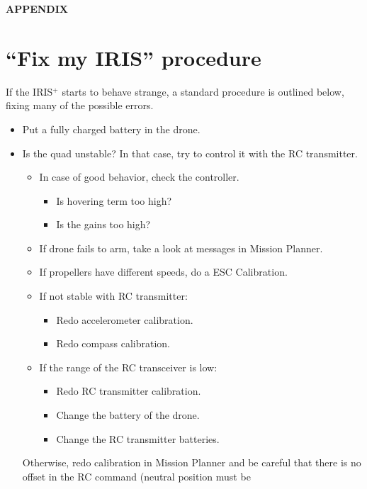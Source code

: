 \documentclass[titlepage,11pt,a4paper]{article}
\begin{document}
\newpage
\begin{appendices}
\begin{center}
  {\bf APPENDIX}
\end{center}

\section{``Fix my IRIS'' procedure}
If the IRIS$^+$ starts to behave strange, a standard procedure is
outlined below, fixing many of the possible errors.

\begin{itemize}
  \item Put a fully charged battery in the drone.
  \item Is the quad unstable? In that case, try to control it with the RC
    transmitter.
    \begin{itemize} 
      \item In case of good behavior, check the controller.
        \begin{itemize}
          \item Is hovering term too high?
          \item Is the gains too high?
        \end{itemize}
      \item If drone fails to arm, take a look at messages in Mission
        Planner.
      \item If propellers have different speeds, do a ESC Calibration.
      \item If not stable with RC transmitter:
        \begin{itemize}
          \item Redo accelerometer calibration.
          \item Redo compass calibration.
        \end{itemize}
      \item If the range of the RC transceiver is low:
        \begin{itemize}
          \item Redo RC transmitter calibration.
          \item Change the battery of the drone.
          \item Change the RC transmitter batteries.
        \end{itemize}
    \end{itemize}
    Otherwise, redo calibration in Mission Planner and be careful that
    there is no offset in the RC command (neutral position must be

\end{itemize}
\end{appendices}
\end{document}
